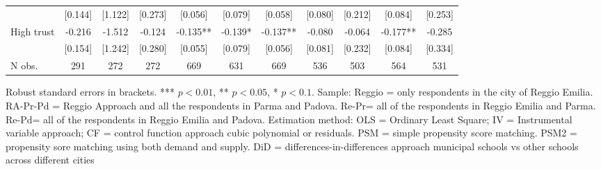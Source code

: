 \documentclass[12pt]{article}
\begin{document}
\begin{table}[ht]
\begin{center}
\begin{adjustbox}{width=1.2\textwidth,center=\textwidth}
\begin{tabular}{l*{10}{c}}
 & [0.144] & [1.122] & [0.273] & [0.056] & [0.079] & [0.058] & [0.080] & [0.212] & [0.084] & [0.253] \\
High trust & -0.216 & -1.512 & -0.124 & -0.135** & -0.139* & -0.137** & -0.080 & -0.064 & -0.177** & -0.285 \\
 & [0.154] & [1.242] & [0.280] & [0.055] & [0.079] & [0.056] & [0.081] & [0.232] & [0.084] & [0.334] \\

\hline
N obs. &  291 & 272 & 272 & 669 & 631 & 669 & 536 & 503 & 564 & 531 \\
\hline
\end{tabular}
\end{adjustbox}
\end{center}

\begin{footnotesize}
\raggedright{Robust standard errors in brackets. *** $p<0.01$, ** $p<0.05$, * $p<0.1$. Sample: Reggio = only respondents in the city of Reggio Emilia. RA-Pr-Pd = Reggio Approach and all the respondents in Parma and Padova. Re-Pr= all of the respondents in Reggio Emilia and Parma. Re-Pd= all of the respondents in Reggio Emilia and Padova. Estimation method: OLS = Ordinary Least Square; IV = Instrumental variable approach; CF = control function approach cubic polynomial or residuals. PSM = simple propensity score matching. PSM2 = propensity sore matching using both demand and supply. DiD = differences-in-differences approach municipal schools vs other schools across different cities}
\end{footnotesize}
\end{table}
\end{document}
